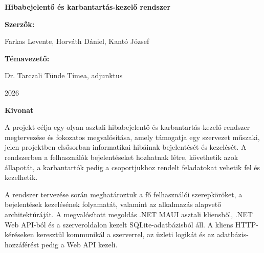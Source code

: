 \documentclass[12pt, a4paper, twoside]{article}
\begin{document}
\begin{titlepage}
    \centering
    \vspace*{1cm}

    {\Huge \bfseries Hibabejelentő és karbantartás-kezelő
    rendszer \par}

    \vspace{2.5cm}

    {\Large \textbf{Szerzők:}\par}
    \vspace{0.2cm}
    {\large Farkas Levente, Horváth Dániel, Kantó József\par}

    \vspace{2cm}

    {\Large \textbf{Témavezető:}\par}
    \vspace{0.2cm}
    {\large Dr. Tarczali Tünde Tímea, adjunktus\par}

    \vfill
    {\large 2026\par}
\end{titlepage}


\newpage
{}

\begin{center}
    \noindent
    {\headingFont\bfseries\fontsize{16}{24}\selectfont Kivonat}
\end{center}
\vspace{12pt}

A projekt célja egy olyan asztali hibabejelentő és karbantartás-kezelő rendszer megtervezése és fokozatos megvalósítása, amely támogatja egy szervezet műszaki, jelen projektben elsősorban informatikai hibáinak bejelentését és kezelését. A rendszerben a felhasználók bejelentéseket hozhatnak létre, követhetik azok állapotát, a karbantartók pedig a csoportjukhoz rendelt feladatokat vehetik fel és kezelhetik.

A rendszer tervezése során meghatároztuk a fő felhasználói szerepköröket, a bejelentések kezelésének folyamatát, valamint az alkalmazás alapvető architektúráját. A megvalósított megoldás .NET MAUI asztali kliensből, .NET Web API-ból és a szerveroldalon kezelt SQLite-adatbázisból áll. A kliens HTTP-kéréseken keresztül kommunikál a szerverrel, az üzleti logikát és az adatbázis-hozzáférést pedig a Web API kezeli.
\end{document}
